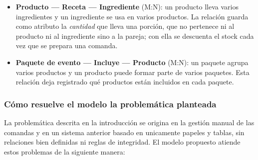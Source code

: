 \begin{itemize}
    \item \textbf{Producto --- Receta --- Ingrediente} (M:N): un producto lleva varios ingredientes y un ingrediente se usa en varios productos. La relación guarda como atributo la \emph{cantidad} que lleva una porción, que no pertenece ni al producto ni al ingrediente sino a la pareja; con ella se descuenta el stock cada vez que se prepara una comanda.

    \item \textbf{Paquete de evento --- Incluye --- Producto} (M:N): un paquete agrupa varios productos y un producto puede formar parte de varios paquetes. Esta relación deja registrado qué productos están incluidos en cada paquete.
\end{itemize}

\subsubsection{Cómo resuelve el modelo la problemática planteada}

La problemática descrita en la introducción se origina en la gestión manual de las comandas y en un sistema anterior basado en unicamente papeles y tablas, sin relaciones bien definidas ni reglas de integridad. El modelo propuesto atiende estos problemas de la siguiente manera:

